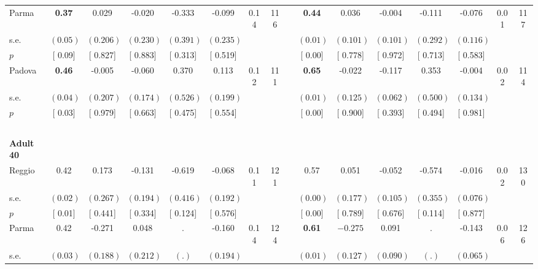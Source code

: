 \begin{longtable}{L{8em} c c c c c c c p{1em} c c c c c c c}
\quad \quad \quad Parma& \textbf{     0.37} &     0.029 &    -0.020 &    -0.333 &    -0.099 &      0.14 &       116 & & \textbf{     0.44} &     0.036 &    -0.004 &    -0.111 &    -0.076 &      0.01 &       117  \\*
\quad \quad \quad \quad s.e.& $ (     0.05)$ & $ (    0.206)$ & $ (    0.230)$ & $ (    0.391)$ & $ (    0.235)$ & & & & $ (     0.01)$ & $ (    0.101)$ & $ (    0.101)$ & $ (    0.292)$ & $ (    0.116)$ & &  \\*
\quad \quad \quad \quad $ p$ & [     0.09] & [    0.827] & [    0.883] & [    0.313] & [    0.519] & & & & [     0.00] & [    0.778] & [    0.972] & [    0.713] & [    0.583] & &  \\[1em]
\quad \quad \quad Padova& \textbf{     0.46} &    -0.005 &    -0.060 &     0.370 &     0.113 &      0.12 &       111 & & \textbf{     0.65} &    -0.022 &    -0.117 &     0.353 &    -0.004 &      0.02 &       114  \\*
\quad \quad \quad \quad s.e.& $ (     0.04)$ & $ (    0.207)$ & $ (    0.174)$ & $ (    0.526)$ & $ (    0.199)$ & & & & $ (     0.01)$ & $ (    0.125)$ & $ (    0.062)$ & $ (    0.500)$ & $ (    0.134)$ & &  \\*
\quad \quad \quad \quad $ p$ & [     0.03] & [    0.979] & [    0.663] & [    0.475] & [    0.554] & & & & [     0.00] & [    0.900] & [    0.393] & [    0.494] & [    0.981] & &  \\[1em]
~\\[1em]
\quad \quad \textbf{Adult 40} & & & & & & & & & & & & & & & \\* 
\quad \quad \quad Reggio& 0.42 &     0.173 &    -0.131 &    -0.619 &    -0.068 &      0.11 &       121 & & 0.57 &     0.051 &    -0.052 &    -0.574 &    -0.016 &      0.02 &       130  \\*
\quad \quad \quad \quad s.e.& $ (     0.02)$ & $ (    0.267)$ & $ (    0.194)$ & $ (    0.416)$ & $ (    0.192)$ & & & & $ (     0.00)$ & $ (    0.177)$ & $ (    0.105)$ & $ (    0.355)$ & $ (    0.076)$ & &  \\*
\quad \quad \quad \quad $ p$ & [     0.01] & [    0.441] & [    0.334] & [    0.124] & [    0.576] & & & & [     0.00] & [    0.789] & [    0.676] & [    0.114] & [    0.877] & &  \\[1em]
\quad \quad \quad Parma& 0.42 &    -0.271 &     0.048 &         . &    -0.160 &      0.14 &       124 & & \textbf{     0.61} & $ \mathbf{   -0.275}$ &     0.091 &         . &    -0.143 &      0.06 &       126  \\*
\quad \quad \quad \quad s.e.& $ (     0.03)$ & $ (    0.188)$ & $ (    0.212)$ & $ (        .)$ & $ (    0.194)$ & & & & $ (     0.01)$ & $ (    0.127)$ & $ (    0.090)$ & $ (        .)$ & $ (    0.065)$ & &  \\*

\end{longtable}
